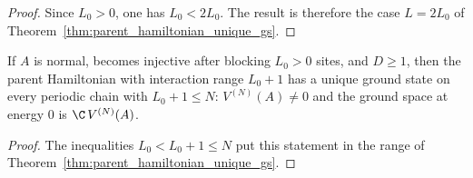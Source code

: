 \begin{proof}
    \leanok
    Since $L_0>0$, one has $L_0<2L_0$. The result is therefore the case
    $L=2L_0$ of Theorem~\ref{thm:parent_hamiltonian_unique_gs}.
\end{proof}

\begin{theorem}%
    \label{thm:unique_gs_normal}
    \leanok
    If $A$ is normal, becomes injective after blocking $L_0 > 0$ sites, and
    $D \ge 1$, then the parent Hamiltonian with interaction range $L_0 + 1$
    has a unique ground state on every periodic chain with $L_0+1\le N$:
    $V^{(N)}(A)\ne0$ and the ground space at energy $0$ is
    $\C\,V^{(N)}(A)$.
\end{theorem}

\begin{proof}
    \leanok
    The inequalities $L_0<L_0+1\leq N$ put this statement in the range of
    Theorem~\ref{thm:parent_hamiltonian_unique_gs}.
\end{proof}
